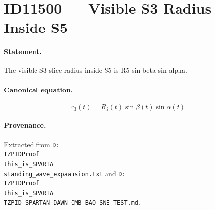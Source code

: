 \section*{ID11500 --- Visible S3 Radius Inside S5}

\paragraph{Statement.}
The visible S3 slice radius inside S5 is R5 sin beta sin alpha.

\paragraph{Canonical equation.}
\[
r_3(t)=R_5(t)\sin\beta(t)\sin\alpha(t)
\]

\paragraph{Provenance.}
Extracted from \texttt{D:\\TZPIDProof\\this\_is\_SPARTA\\standing\_wave\_expaansion.txt} and \texttt{D:\\TZPIDProof\\this\_is\_SPARTA\\TZPID\_SPARTAN\_DAWN\_CMB\_BAO\_SNE\_TEST.md}.
